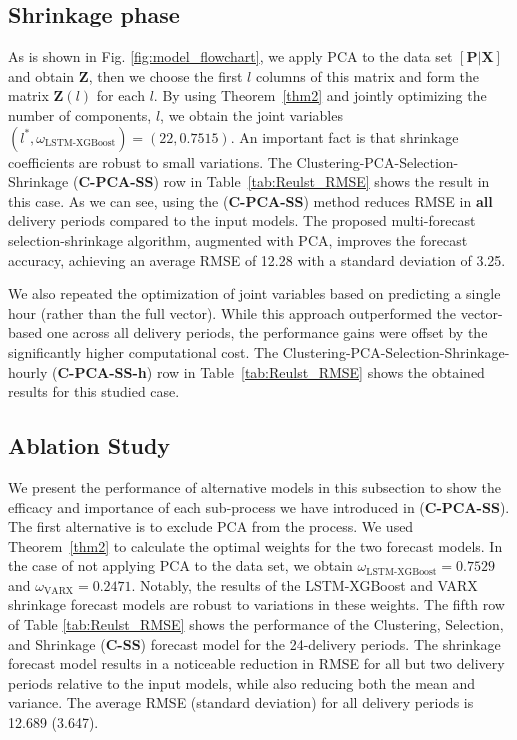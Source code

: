 \documentclass{article}
\begin{document}
\subsection{Shrinkage phase}
 As is shown in Fig. \ref{fig:model_flowchart}, we apply PCA to the data set $[\mathbf{P}|\mathbf{X}]$ and obtain $\textbf{Z}$, then we choose the first $l$ columns of this matrix and form the matrix $\textbf{Z}(l)$ for each $l$. By using Theorem~\ref{thm2} and jointly optimizing the number of components, $l$, we obtain the joint variables $(l^*, \omega_{\text{LSTM-XGBoost}}) = (22, 0.7515)$. An important fact is that shrinkage coefficients are robust to small variations. The Clustering-PCA-Selection-Shrinkage (\textbf{C-PCA-SS}) row in Table~\ref{tab:Reulst_RMSE} shows the result in this case. As we can see, using the (\textbf{C-PCA-SS}) method reduces RMSE in \textbf{all} delivery periods compared to the input models. The proposed multi-forecast selection-shrinkage algorithm, augmented with PCA, improves the forecast accuracy, achieving an average RMSE of 12.28 with a standard deviation of 3.25. 

We also repeated the optimization of joint variables based on predicting a single hour (rather than the full vector). While this approach outperformed the vector-based one across all delivery periods, the performance gains were offset by the significantly higher computational cost. The Clustering-PCA-Selection-Shrinkage-hourly (\textbf{C-PCA-SS-h}) row in Table~\ref{tab:Reulst_RMSE} shows the obtained results for this studied case. 

\subsection{Ablation Study}
We present the performance of alternative models in this subsection to show the efficacy and importance of each sub-process we have introduced in (\textbf{C-PCA-SS}). The first alternative is to exclude PCA from the process. We used Theorem~\ref{thm2} to calculate the optimal weights for the two forecast models. In the case of not applying PCA to the data set, we obtain $\omega_{\text{LSTM-XGBoost}}=0.7529$ and $\omega_{\text{VARX}}=0.2471$.  
Notably, the results of the LSTM-XGBoost and VARX shrinkage forecast models are robust to variations in these weights. The fifth row of Table \ref{tab:Reulst_RMSE} shows the performance of the Clustering, Selection, and Shrinkage (\textbf{C-SS}) forecast model for the 24-delivery periods. The shrinkage forecast model results in a noticeable reduction in RMSE for all but two delivery periods relative to the input models, while also reducing both the mean and variance. The average RMSE (standard deviation) for all delivery periods is 12.689 (3.647).
\end{document}
